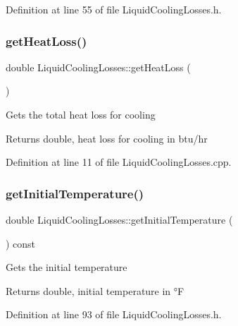 Definition at line 55 of file Liquid\+Cooling\+Losses.\+h.

\mbox{\label{class_liquid_cooling_losses_a6a131f8f3141edef7f29df4455c6aee5}} 
\subsubsection{\texorpdfstring{get\+Heat\+Loss()}{getHeatLoss()}}
{\footnotesize\ttfamily double Liquid\+Cooling\+Losses\+::get\+Heat\+Loss (\begin{DoxyParamCaption}{ }\end{DoxyParamCaption})}

Gets the total heat loss for cooling

\begin{DoxyReturn}{Returns}
double, heat loss for cooling in btu/hr 
\end{DoxyReturn}


Definition at line 11 of file Liquid\+Cooling\+Losses.\+cpp.

\mbox{\label{class_liquid_cooling_losses_a4cfb23800b80e99858bbc5c3ef5169eb}} 
\subsubsection{\texorpdfstring{get\+Initial\+Temperature()}{getInitialTemperature()}}
{\footnotesize\ttfamily double Liquid\+Cooling\+Losses\+::get\+Initial\+Temperature (\begin{DoxyParamCaption}{ }\end{DoxyParamCaption}) const\hspace{0.3cm}{\ttfamily [inline]}}

Gets the initial temperature

\begin{DoxyReturn}{Returns}
double, initial temperature in °F 
\end{DoxyReturn}


Definition at line 93 of file Liquid\+Cooling\+Losses.\+h.

